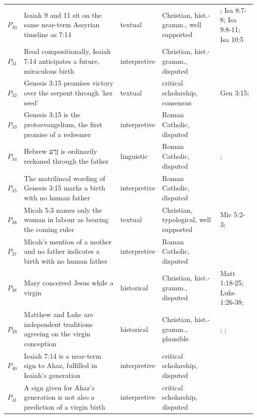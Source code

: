 \documentclass[11pt]{article}
\begin{document}
\begin{longtable}{@{}r >{\raggedright\arraybackslash}p{} l >{\raggedright\arraybackslash}p{} >{\raggedright\arraybackslash}p{}@{}}
$P_{30}$ & Isaiah 9 and 11 sit on the same near-term Assyrian timeline as 7:14 & textual & Christian, hist.-gramm., well supported & \cite[487--489]{postell-isaiah-messianic-2025}; Isa 8:7-8; Isa 9:8-11; Isa 10:5 \\
$P_{31}$ & Read compositionally, Isaiah 7:14 anticipates a future, miraculous birth & interpretive & Christian, hist.-gramm., disputed & \cite[490--493]{postell-isaiah-messianic-2025} \\
$P_{32}$ & Genesis 3:15 promises victory over the serpent through 'her seed' & textual & critical scholarship, consensus & Gen 3:15; \cite[app. Gen 3:15]{bhs-1997} \\
$P_{33}$ & Genesis 3:15 is the protoevangelium, the first promise of a redeemer & interpretive & Roman Catholic, disputed & \cite[9--10]{miravalle-meet-mary-2007} \\
$P_{34}$ & Hebrew זֶרַע is ordinarily reckoned through the father & linguistic & Roman Catholic, disputed & \cite[9--10]{miravalle-meet-mary-2007}; \cite[app. Gen 3:15]{bhs-1997} \\
$P_{35}$ & The matrilineal wording of Genesis 3:15 marks a birth with no human father & interpretive & Roman Catholic, disputed & \cite[9--10]{miravalle-meet-mary-2007} \\
$P_{36}$ & Micah 5:3 names only the woman in labour as bearing the coming ruler & textual & Christian, typological, well supported & Mic 5:2-3; \cite[ad loc. Mic 5:3]{keil-delitzsch-minor-prophets-1949} \\
$P_{37}$ & Micah's mention of a mother and no father indicates a birth with no human father & interpretive & Roman Catholic, disputed & \cite[9--10]{miravalle-meet-mary-2007} \\
$P_{38}$ & Mary conceived Jesus while a virgin & historical & Christian, hist.-gramm., disputed & Matt 1:18-25; Luke 1:26-38; \cite[30--33]{brown-problem-virginal-conception-1972} \\
$P_{39}$ & Matthew and Luke are independent traditions agreeing on the virgin conception & historical & Christian, hist.-gramm., plausible & \cite[26--38]{brown-birth-messiah-1993}; \cite[24]{brown-problem-virginal-conception-1972}; \cite[71]{rhodea-did-matthew-conceive-2013} \\
$P_{40}$ & Isaiah 7:14 is a near-term sign to Ahaz, fulfilled in Isaiah's generation & interpretive & critical scholarship, disputed & \cite{brown-birth-messiah-1993} \\
$P_{41}$ & A sign given for Ahaz's generation is not also a prediction of a virgin birth & interpretive & critical scholarship, disputed & \cite{brown-birth-messiah-1993} \\

\end{longtable}
\end{document}

